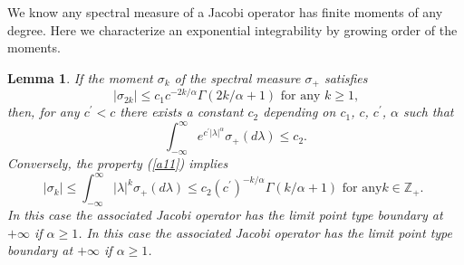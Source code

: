 \documentclass[a4paper]{article}%
\newtheorem{lemma}{Lemma}
\begin{document}
We know any spectral measure of a Jacobi operator has finite moments of any
degree. Here we characterize an exponential integrability by growing order of
the moments.

\begin{lemma}
\label{a-4}If the moment $\sigma_{k}$ of the spectral measure $\sigma_{+}$
satisfies%
\begin{equation}
\left\vert \sigma_{2k}\right\vert \leq c_{1}c^{-2k/\alpha}\Gamma\left(
2k/\alpha+1\right)  \text{ for any }k\geq1\text{,} \label{a10}%
\end{equation}
then, for any $c^{\prime}<c$ there exists a constant $c_{2}$ depending on
$c_{1}$, $c$, $c^{\prime}$, $\alpha$ such that%
\begin{equation}
\int_{-\infty}^{\infty}e^{c^{\prime}\left\vert \lambda\right\vert ^{\alpha}%
}\sigma_{+}\left(  d\lambda\right)  \leq c_{2}\text{.} \label{a11}%
\end{equation}
Conversely, the property (\ref{a11}) implies
\begin{equation}
\left\vert \sigma_{k}\right\vert \leq\int_{-\infty}^{\infty}\left\vert
\lambda\right\vert ^{k}\sigma_{+}\left(  d\lambda\right)  \leq c_{2}\left(
c^{\prime}\right)  ^{-k/\alpha}\Gamma\left(  k/\alpha+1\right)  \text{ for any
}k\in\mathbb{Z}_{+}\text{. } \label{a12}%
\end{equation}
In this case the associated Jacobi operator has the limit point type boundary
at $+\infty$ if $\alpha\geq1$. In this case the associated Jacobi operator has
the limit point type boundary at $+\infty$ if $\alpha\geq1$.
\end{lemma}
\end{document}
